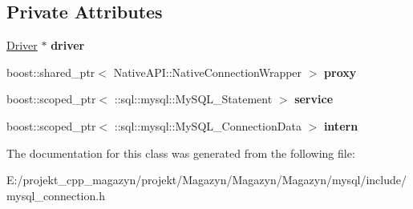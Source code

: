 \subsection*{Private Attributes}
\begin{DoxyCompactItemize}
\item 
\hypertarget{classsql_1_1mysql_1_1_my_s_q_l___connection_a02c7eca4eb55f6ddadf2c81419d8faf2}{}\label{classsql_1_1mysql_1_1_my_s_q_l___connection_a02c7eca4eb55f6ddadf2c81419d8faf2} 
\hyperlink{classsql_1_1_driver}{Driver} $\ast$ {\bfseries driver}
\item 
\hypertarget{classsql_1_1mysql_1_1_my_s_q_l___connection_a4e5e011271ee687e7c42c55716f99826}{}\label{classsql_1_1mysql_1_1_my_s_q_l___connection_a4e5e011271ee687e7c42c55716f99826} 
boost\+::shared\+\_\+ptr$<$ Native\+A\+P\+I\+::\+Native\+Connection\+Wrapper $>$ {\bfseries proxy}
\item 
\hypertarget{classsql_1_1mysql_1_1_my_s_q_l___connection_a5a88e82b22a22f2f0c46f519ceff8752}{}\label{classsql_1_1mysql_1_1_my_s_q_l___connection_a5a88e82b22a22f2f0c46f519ceff8752} 
boost\+::scoped\+\_\+ptr$<$ \+::sql\+::mysql\+::\+My\+S\+Q\+L\+\_\+\+Statement $>$ {\bfseries service}
\item 
\hypertarget{classsql_1_1mysql_1_1_my_s_q_l___connection_a4fed30f045e178b5eb5baeb2ee1c7129}{}\label{classsql_1_1mysql_1_1_my_s_q_l___connection_a4fed30f045e178b5eb5baeb2ee1c7129} 
boost\+::scoped\+\_\+ptr$<$ \+::sql\+::mysql\+::\+My\+S\+Q\+L\+\_\+\+Connection\+Data $>$ {\bfseries intern}
\end{DoxyCompactItemize}


The documentation for this class was generated from the following file\+:\begin{DoxyCompactItemize}
\item 
E\+:/projekt\+\_\+cpp\+\_\+magazyn/projekt/\+Magazyn/\+Magazyn/\+Magazyn/mysql/include/mysql\+\_\+connection.\+h\end{DoxyCompactItemize}
